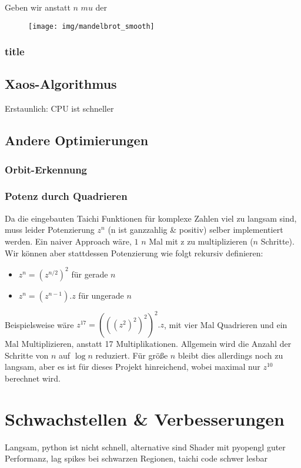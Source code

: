 \documentclass{article}
\begin{document}
Geben wir anstatt $n$ $mu$ der 

\begin{figure}
\centering
\texttt{[image: img/mandelbrot\_smooth]}
\caption{}
\label{fig:mandelbrot_smooth}
\end{figure}


\subsubsection{title}

\subsection{Xaos-Algorithmus}
Erstaunlich: CPU ist schneller

\subsection{Andere Optimierungen}
\subsubsection{Orbit-Erkennung}
\subsubsection{Potenz durch Quadrieren}
Da die eingebauten Taichi Funktionen für komplexe Zahlen viel zu langsam sind, muss leider Potenzierung $z^n$ (n ist ganzzahlig \& positiv) selber implementiert werden. Ein naiver Approach wäre, $1$ $n$ Mal mit z zu multiplizieren ($n$ Schritte). Wir können aber stattdessen Potenzierung wie folgt rekursiv definieren: 
\begin{itemize}
\item $z^n = (z^{n/2})^2$ für gerade $n$ 
\item $z^n = (z^{n-1}).z$ für ungerade $n$
\end{itemize}
Beispielsweise wäre $z^{17} = (((z^2)^2)^2)^2 . z$, mit vier Mal Quadrieren und ein Mal Multiplizieren, anstatt 17 Multiplikationen. Allgemein wird die Anzahl der Schritte von $n$ auf $\log n$ reduziert. Für größe $n$ bleibt dies allerdings noch zu langsam, aber es ist für dieses Projekt hinreichend, wobei maximal nur $z^{10}$ berechnet wird.

\section{Schwachstellen \& Verbesserungen}
Langsam, python ist nicht schnell, alternative sind Shader mit pyopengl guter Performanz, lag spikes bei schwarzen Regionen, taichi code schwer lesbar
\printbibliography
\end{document}
